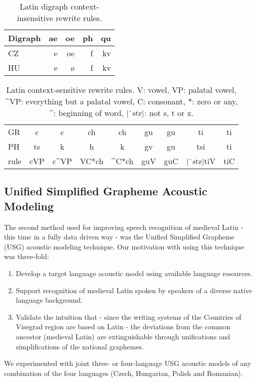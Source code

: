 \documentclass[runningheads,a4paper]{llncs}
\begin{document}
\begin{table}
	\centering
	\caption{Latin digraph context-insensitive rewrite rules.}\label{tbl:digraph}
	\begin{tabular}{l|rrrr}
	\hline
	Digraph & ae & oe & ph & qu \\
	\hline
	CZ & e & oe & f & kv \\
	HU & e & \o & f & kv \\
	\hline
	\end{tabular}
\end{table}

\begin{table}
	\centering
	\caption{Latin context-sensitive rewrite rules. V: vowel, VP: palatal vowel, \string^VP: everything but a palatal vowel, C: consonant, $*$: zero or any, \string^: beginning of word, $[\string^stx]$: not s, t or x.}\label{tbl:context}
	\begin{tabular}{l|cc|cc|cc|cc}
	\hline
	GR & c & c & ch & ch & gu & gu & ti & ti \\
	PH & ts & k & h & k & gv & gu & tsi & ti \\
	\hline
	rule & \multicolumn{1}{c|}{cVP} & \multicolumn{1}{c|}{c\string^VP} & \multicolumn{1}{c|}{VC*ch} & \multicolumn{1}{c|}{\string^C*ch} & \multicolumn{1}{c|}{guV} & \multicolumn{1}{c|}{guC} & \multicolumn{1}{c|}{$[\string^stx]$tiV} & \multicolumn{1}{c|}{tiC} \\
	\hline
	\end{tabular}
\end{table}

\subsection{Unified Simplified Grapheme Acoustic Modeling}\label{usg}
The second method used for improving speech recognition of medieval Latin - this time in a fully data driven way - was the Unified Simplified Grapheme (USG) acoustic modeling technique.
Our motivation with using this technique was three-fold:
\begin{enumerate}
\item Develop a target language acoustic model using available language resources.
\item Support recognition of medieval Latin spoken by speakers of a diverse native language background.
\item Validate the intuition that - since the writing systems of the Countries of Visegrad region are based on Latin - the deviations from the common ancestor (medieval Latin) are extinguishable through unifications and simplifications of the national graphemes.
\end{enumerate}
We experimented with joint three- or four-language USG acoustic models of any combination of the four languages (Czech, Hungarian, Polish and Romanian). 
\end{document}
